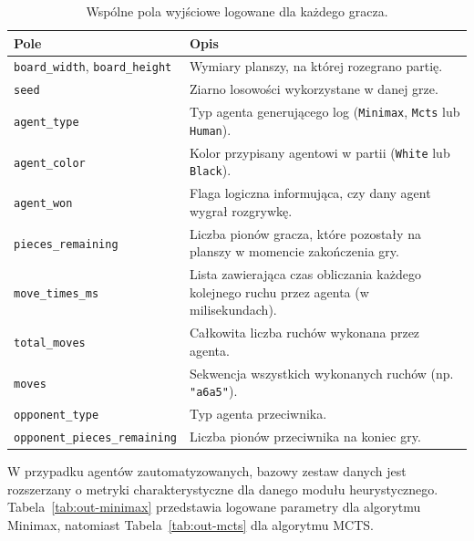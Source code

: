 \documentclass{article}
\begin{document}
\begin{table}[H]
    \centering
    \caption{Wspólne pola wyjściowe logowane dla każdego gracza.}
    \label{tab:out-common}
    \renewcommand{\arraystretch}{1.2}
    \begin{tabularx}{\textwidth}{|l|X|}
        \hline
        \textbf{Pole} & \textbf{Opis} \\
        \hline
        \texttt{board\_width}, \texttt{board\_height} & Wymiary planszy, na której rozegrano partię. \\
        \texttt{seed} & Ziarno losowości wykorzystane w danej grze. \\
        \texttt{agent\_type} & Typ agenta generującego log (\texttt{Minimax}, \texttt{Mcts} lub \texttt{Human}). \\
        \texttt{agent\_color} & Kolor przypisany agentowi w partii (\texttt{White} lub \texttt{Black}). \\
        \texttt{agent\_won} & Flaga logiczna informująca, czy dany agent wygrał rozgrywkę. \\
        \texttt{pieces\_remaining} & Liczba pionów gracza, które pozostały na planszy w momencie zakończenia gry. \\
        \texttt{move\_times\_ms} & Lista zawierająca czas obliczania każdego kolejnego ruchu przez agenta (w milisekundach). \\
        \texttt{total\_moves} & Całkowita liczba ruchów wykonana przez agenta. \\
        \texttt{moves} & Sekwencja wszystkich wykonanych ruchów (np. \texttt{"a6a5"}). \\
        \texttt{opponent\_type} & Typ agenta przeciwnika. \\
        \texttt{opponent\_pieces\_remaining} & Liczba pionów przeciwnika na koniec gry. \\
        \hline
    \end{tabularx}
\end{table}

\noindent
W przypadku agentów zautomatyzowanych, bazowy zestaw danych jest rozszerzany o metryki charakterystyczne dla danego modułu heurystycznego. Tabela~\ref{tab:out-minimax} przedstawia logowane parametry dla algorytmu Minimax, natomiast Tabela~\ref{tab:out-mcts} dla algorytmu MCTS.
\end{document}
